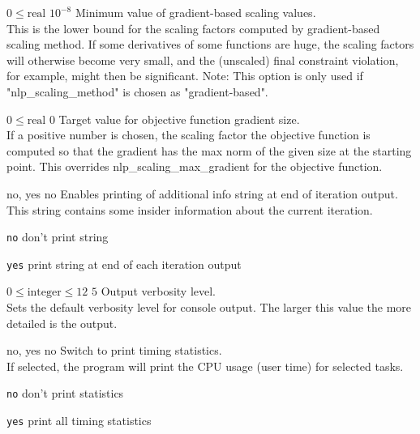 %
{$0\leq\textrm{real}$}%
{$10^{- 8}$}%
{Minimum value of gradient-based scaling values.\\
This is the lower bound for the scaling factors computed by gradient-based scaling method.  If some derivatives of some functions are huge, the scaling factors will otherwise become very small, and the (unscaled) final constraint violation, for example, might then be significant.  Note: This option is only used if "nlp\_scaling\_method" is chosen as "gradient-based".}%
{}

%
{$0\leq\textrm{real}$}%
{$0$}%
{Target value for objective function gradient size.\\
If a positive number is chosen, the scaling factor the objective function is computed so that the gradient has the max norm of the given size at the starting point.  This overrides nlp\_scaling\_max\_gradient for the objective function.}%
{}

%
{\ttfamily no, yes}%
{no}%
{Enables printing of additional info string at end of iteration output.\\
This string contains some insider information about the current iteration.}%
{\begin{list}{}{
\setlength{\parsep}{0em}
\setlength{\leftmargin}{5ex}
\setlength{\labelwidth}{2ex}
\setlength{\itemindent}{0ex}
\setlength{\topsep}{0pt}}
\item[\texttt{no}] don't print string
\item[\texttt{yes}] print string at end of each iteration output
\end{list}
}

%
{$0\leq\textrm{integer}\leq12$}%
{$5$}%
{Output verbosity level.\\
Sets the default verbosity level for console output. The larger this value the more detailed is the output.}%
{}

%
{\ttfamily no, yes}%
{no}%
{Switch to print timing statistics.\\
If selected, the program will print the CPU usage (user time) for selected tasks.}%
{\begin{list}{}{
\setlength{\parsep}{0em}
\setlength{\leftmargin}{5ex}
\setlength{\labelwidth}{2ex}
\setlength{\itemindent}{0ex}
\setlength{\topsep}{0pt}}
\item[\texttt{no}] don't print statistics
\item[\texttt{yes}] print all timing statistics
\end{list}
}

